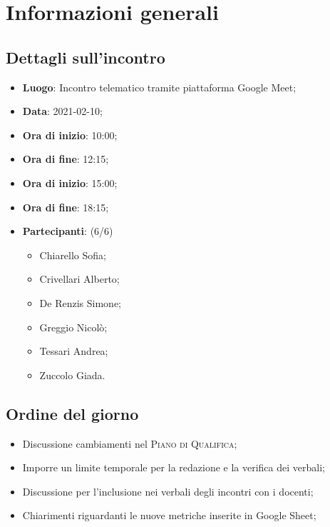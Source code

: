 \section{Informazioni generali}

\subsection{Dettagli sull'incontro}
\begin{itemize}
\item \textbf{Luogo}: Incontro telematico tramite piattaforma Google Meet;
\item \textbf{Data}: 2021-02-10;
\item \textbf{Ora di inizio}: 10:00;
\item \textbf{Ora di fine}: 12:15;
\item \textbf{Ora di inizio}: 15:00;
\item \textbf{Ora di fine}: 18:15;
\item \textbf{Partecipanti}: (6/6)
\begin{itemize}
	\item Chiarello Sofia;
    \item Crivellari Alberto;
    \item De Renzis Simone;
    \item Greggio Nicolò;
    \item Tessari Andrea;
    \item Zuccolo Giada.
\end{itemize}
\end{itemize}

\subsection{Ordine del giorno}
\begin{itemize}
	\item Discussione cambiamenti nel \textsc{Piano di Qualifica};
	\item Imporre un limite temporale per la redazione e la verifica dei verbali;
	\item Discussione per l'inclusione nei verbali degli incontri con i docenti;
	\item Chiarimenti riguardanti le nuove metriche inserite in Google Sheet;
\end{itemize}


